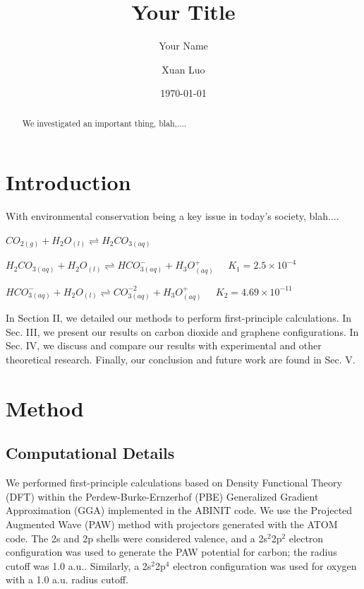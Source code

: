 \documentclass[letterpaper,showpacs,prb,preprint]{revtex4}
\begin{document}
\title{Your Title }
\author{Your Name}
\author{Xuan Luo}
\date{\today}
\begin{abstract}
\setlength{\parindent}{1cm}
We investigated an important thing, blah,....

\end{abstract}

\newpage
\maketitle
\section{Introduction}
With environmental conservation being a key issue in today's society, blah....


$CO_{2 (g)} + H_{2}O_{(l)} \rightleftharpoons H_{2}CO_{3 (aq)}$

$H_{2}CO_{3 (aq)} + H_{2}O_{(l)} \rightleftharpoons HCO_{3 (aq)}^{-} + H_{3}O^{+}_{(aq)} \; \; \; \; \; K_{1} = 2.5 \times 10^{-4}$

$HCO_{3 (aq)}^{-} + H_{2}O_{(l)} \rightleftharpoons CO_{3 (aq)}^{-2} + H_{3}O^{+}_{(aq)} \; \; \; \; \; K_{2} = 4.69 \times 10^{-11}$ 


In Section II, we detailed our methods to perform first-principle calculations. In Sec. III, we present our results on carbon dioxide and graphene configurations.
In Sec. IV, we discuss and compare our results with experimental and other theoretical research. Finally, our conclusion and future work are found in Sec. V.

\section{Method}

\subsection{Computational Details}

We performed first-principle calculations based on Density Functional
Theory (DFT) within the Perdew-Burke-Ernzerhof (PBE) Generalized
Gradient Approximation (GGA) implemented in the ABINIT\cite{gonze2009}
code. We use the Projected Augmented Wave (PAW) method\cite{blochl1994} with
projectors generated with the ATOM code\cite{holzwarth2001}. 
The 2s and 2p shells were considered valence, and a 2s$^{2}$2p$^{2}$ electron configuration was used to generate the PAW potential for carbon; the radius cutoff was 1.0 a.u.. 
Similarly, a 2s$^{2}$2p$^{4}$ electron configuration was used for oxygen with a 1.0 a.u.  radius cutoff.
\end{document}
